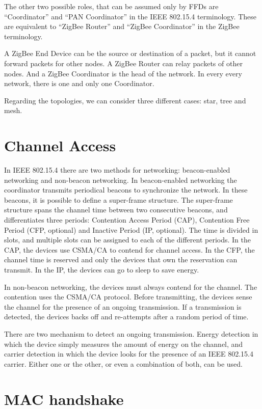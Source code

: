The other two possible roles, that can be assumed only by FFDs are ``Coordinator'' and ``PAN Coordinator'' in the IEEE 802.15.4 terminology.
These are equivalent to ``ZigBee Router'' and  ``ZigBee Coordinator'' in the ZigBee terminology.

A ZigBee End Device can be the source or destination of a packet, but it cannot forward packets for other nodes.
A ZigBee Router can relay packets of other nodes.
And a ZigBee Coordinator is the head of the network.
In every every network, there is one and only one Coordinator.

Regarding the topologies, we can consider three different cases: star, tree and mesh.

\section{Channel Access}

In IEEE 802.15.4 there are two methods for networking: beacon-enabled networking and non-beacon networking.
In beacon-enabled networking the coordinator transmits periodical beacons to synchronize the network.
In these beacons, it is possible to define a super-frame structure.
The super-frame structure spans the channel time between two consecutive beacons, and differentiates three periods: Contention Access Period (CAP), Contention Free Period (CFP, optional) and Inactive Period (IP, optional).
The time is divided in slots, and multiple slots can be assigned to each of the different periods.
In the CAP, the devices use CSMA/CA to contend for channel access.
In the CFP, the channel time is reserved and only the devices that own the reservation can transmit.
In the IP, the devices can go to sleep to save energy.

In non-beacon networking, the devices must always contend for the channel.
The contention uses the CSMA/CA protocol.
Before transmitting, the devices sense the channel for the presence of an ongoing transmission.
If a transmission is detected, the devices backs off and re-attempts after a random period of time.

There are two mechanism to detect an ongoing transmission.
Energy detection in which the device simply measures the amount of energy on the channel,
and carrier detection in which the device looks for the presence of an IEEE 802.15.4 carrier.
Either one or the other, or even a combination of both, can be used.

\section{MAC handshake}

